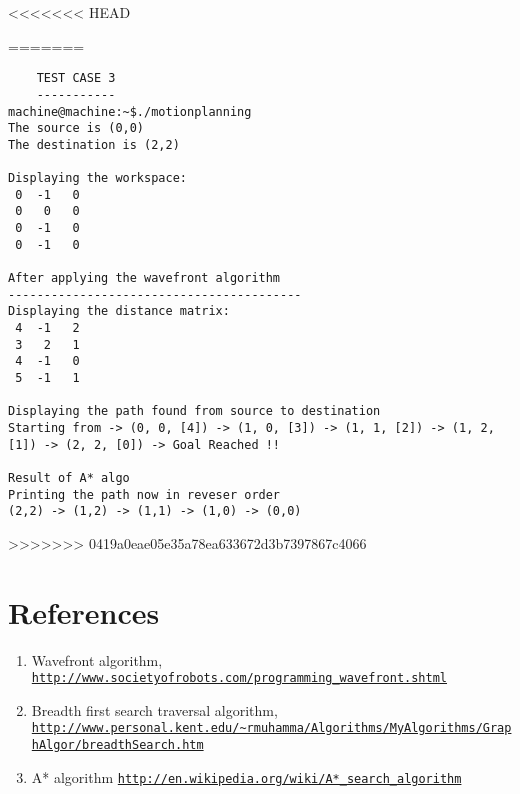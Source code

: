 \documentclass[12pt]{article}
\begin{document}
<<<<<<< HEAD


=======
	\begin{verbatim}	
	TEST CASE 3
	-----------
machine@machine:~$./motionplanning
The source is (0,0) 
The destination is (2,2) 

Displaying the workspace:
 0	-1	 0	
 0	 0	 0	
 0	-1	 0	
 0	-1	 0	

After applying the wavefront algorithm
-----------------------------------------
Displaying the distance matrix:
 4	-1	 2	
 3	 2	 1	
 4	-1	 0	
 5	-1	 1	

Displaying the path found from source to destination 
Starting from -> (0, 0, [4]) -> (1, 0, [3]) -> (1, 1, [2]) -> (1, 2, [1]) -> (2, 2, [0]) -> Goal Reached !!

Result of A* algo
Printing the path now in reveser order
(2,2) -> (1,2) -> (1,1) -> (1,0) -> (0,0)
	\end{verbatim}	
>>>>>>> 0419a0eae05e35a78ea633672d3b7397867c4066
	

\section{References}
	\begin{enumerate}
	\item \label{item:1}Wavefront algorithm, \href{http://www.societyofrobots.com/programming_wavefront.shtml}{\nolinkurl{http://www.societyofrobots.com/programming_wavefront.shtml}}
	\item \label{item:2} Breadth first search traversal algorithm, \href{http://www.personal.kent.edu/~rmuhamma/Algorithms/MyAlgorithms/GraphAlgor/breadthSearch.htm}{\nolinkurl{http://www.personal.kent.edu/~rmuhamma/Algorithms/MyAlgorithms/GraphAlgor/breadthSearch.htm}}
	\item \label{item:3} A* algorithm \href{http://en.wikipedia.org/wiki/A*_search_algorithm}{\nolinkurl{http://en.wikipedia.org/wiki/A*_search_algorithm}}
	\end{enumerate}
\end{document}
